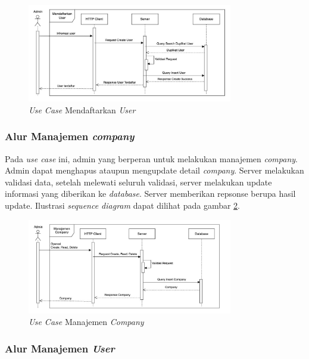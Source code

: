 \begin{figure}[ht]
  \centering
  \includegraphics[width=0.8\textwidth]{resources/chapter-3/usecase/uc-02.jpg}
  \caption{\textit{Use Case} Mendaftarkan \textit{User}}
  \label{fig:usecase-02}
\end{figure}

\pagebreak

\subsubsection{Alur Manajemen \textit{company}}

Pada \textit{use case} ini, admin yang berperan untuk melakukan manajemen \textit{company}. Admin dapat menghapus ataupun mengupdate detail \textit{company}. Server melakukan validasi data, setelah melewati seluruh validasi, server melakukan update informasi yang diberikan ke \textit{database}. Server memberikan repsonse berupa hasil update. Ilustrasi \textit{sequence diagram} dapat dilihat pada gambar \ref{fig:usecase-03}.

\begin{figure}[ht]
  \centering
  \includegraphics[width=0.8\textwidth]{resources/chapter-3/usecase/uc-03.jpg}
  \caption{\textit{Use Case} Manajemen \textit{Company}}
  \label{fig:usecase-03}
\end{figure}

\subsubsection{Alur Manajemen \textit{User}}

